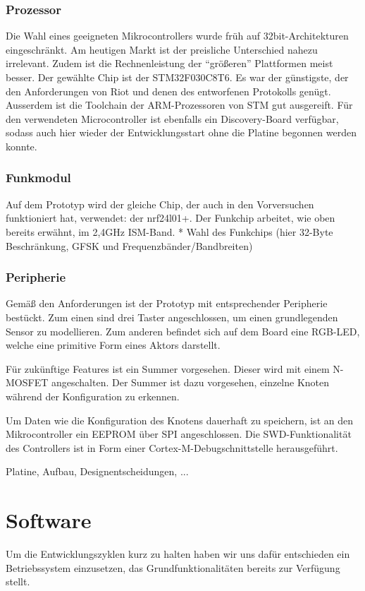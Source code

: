 \documentclass{IEEEtran}
\begin{document}
\subsubsection{Prozessor}
Die Wahl eines geeigneten Mikrocontrollers wurde früh auf 32bit-Architekturen eingeschränkt. Am heutigen Markt ist der preisliche Unterschied nahezu irrelevant. Zudem ist die Rechnenleistung der \enquote{größeren} Plattformen meist besser. Der gewählte Chip ist der STM32F030C8T6. Es war der günstigste, der den Anforderungen von Riot und denen des entworfenen Protokolls genügt. Ausserdem ist die Toolchain der ARM-Prozessoren von STM gut ausgereift.
Für den verwendeten Microcontroller ist ebenfalls ein Discovery-Board verfügbar, sodass auch hier wieder der Entwicklungsstart ohne die Platine begonnen werden konnte.

\subsubsection{Funkmodul}
Auf dem Prototyp wird der gleiche Chip, der auch in den Vorversuchen funktioniert hat, verwendet: der nrf24l01+. Der Funkchip arbeitet, wie oben bereits erwähnt, im 2,4GHz ISM-Band.
* Wahl des Funkchips (hier 32-Byte Beschränkung, GFSK und Frequenzbänder/Bandbreiten)

\subsubsection{Peripherie}
Gemäß den Anforderungen ist der Prototyp mit entsprechender Peripherie bestückt.
Zum einen sind drei Taster angeschlossen, um einen grundlegenden Sensor zu modellieren.
Zum anderen befindet sich auf dem Board eine RGB-LED, welche eine primitive Form eines Aktors darstellt.

Für zukünftige Features ist ein Summer vorgesehen.
Dieser wird mit einem N-MOSFET angeschalten.
Der Summer ist dazu vorgesehen, einzelne Knoten während der Konfiguration zu erkennen.

Um Daten wie die Konfiguration des Knotens dauerhaft zu speichern, ist an den Mikrocontroller ein EEPROM über SPI angeschlossen.
Die SWD-Funktionalität des Controllers ist in Form einer Cortex-M-Debugschnittstelle herausgeführt.




    Platine, Aufbau, Designentscheidungen, ...


\section{Software}
    Um die Entwicklungszyklen kurz zu halten haben wir uns dafür entschieden
    ein Betriebssystem einzusetzen, das Grundfunktionalitäten bereits
    zur Verfügung stellt.
\end{document}
